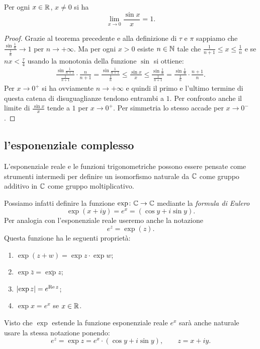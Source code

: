 \begin{theorem}
Per ogni $x\in{\mathbb R}$, $x\neq 0$ si ha 
\[
\lim_{x\to 0}\frac{\sin x}{x} = 1.
\]
\end{theorem}
%
\begin{proof}
Grazie al teorema precedente e alla definizione di $\tau$ e $\pi$ 
sappiamo che $\frac{\sin \frac 1 n}{\frac 1 n}\to 1$ per $n\to +\infty$.
Ma per ogni $x>0$ esiste $n\in {\mathbb N}$ tale che 
$\frac 1 {n+1} \le x \le \frac 1 n$ 
e se $nx<\frac \tau 4$ usando la monotonia della funzione $\sin$ 
si ottiene:
\begin{align*}
  \frac{\sin \frac 1{n+1}}{\frac 1 {n+1}} 
  \cdot \frac{n}{n+1}
  =\frac{\sin \frac 1{n+1}}{\frac 1 {n}} 
  \le \frac{\sin x}{x}
  \le \frac{\sin \frac 1 n}{\frac 1 {n+1}}
  = \frac{\sin \frac 1 n}{\frac 1 n} \cdot \frac{n+1}{n}.
\end{align*}
Per $x\to 0^+$ si ha ovviamente $n\to+\infty$ e quindi 
il primo e l'ultimo termine di questa catena di disuguaglianze 
tendono entrambi a $1$.
Per confronto anche il limite di $\frac{\sin x}{x}$ tende 
a $1$ per $x\to 0^+$.
Per simmetria lo stesso accade per $x\to 0^-$.
\end{proof}

\subsection{l'esponenziale complesso}

L'esponenziale reale e le funzioni trigonometriche possono essere pensate 
come strumenti intermedi per definire un isomorfismo naturale 
da ${\mathbb C}$ come gruppo additivo in ${\mathbb C}$ come gruppo moltiplicativo.

Possiamo infatti definire la funzione $\exp \colon {\mathbb C} \to {\mathbb C}$ mediante 
la \emph{formula di Eulero}
\[
 \exp(x+iy) = e^x = (\cos y + i \sin y).
\]
Per analogia con l'esponenziale reale useremo anche la notazione 
\[
 e^z = \exp(z).  
\]
Questa funzione ha le seguenti proprietà:
\begin{enumerate}
  \item $\exp(z+w) = \exp z \cdot \exp w$;
  \item $\exp\bar z = \overline{\exp z}$;
  \item ${\left|\exp z\right|} = e^{\operatorname{Re} z}$;
  \item $\exp x = e^x$ se $x\in {\mathbb R}$.
\end{enumerate}
Visto che $\exp$ estende la funzione esponenziale reale $e^x$
sarà anche naturale usare la stessa notazione ponendo:
\[
  e^z = \exp z = e^x\cdot (\cos y + i\sin y), \qquad z=x+iy.  
\]

